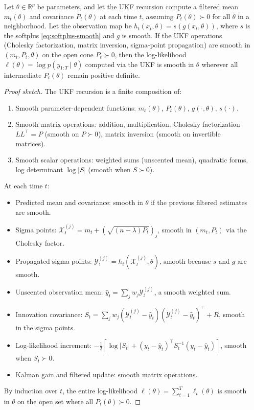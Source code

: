 \begin{proposition}
\label{prop:ukf-smooth}
Let $\theta \in \mathbb{R}^p$ be parameters, and let the UKF recursion compute a filtered mean $m_t(\theta)$ and covariance $P_t(\theta)$ at each time $t$, assuming $P_t(\theta) \succ 0$ for all $\theta$ in a neighborhood. Let the observation map be $h_t(x_t, \theta) = s(g(x_t, \theta))$, where $s$ is the softplus \eqref{eq:softplus-smooth} and $g$ is smooth. If the UKF operations (Cholesky factorization, matrix inversion, sigma-point propagation) are smooth in $(m_t, P_t, \theta)$ on the open cone $P_t \succ 0$, then the log-likelihood $\ell(\theta) = \log p(y_{1:T} \mid \theta)$ computed via the UKF is smooth in $\theta$ wherever all intermediate $P_t(\theta)$ remain positive definite.
\end{proposition}

\begin{proof}[Proof sketch]
The UKF recursion is a finite composition of:
\begin{enumerate}
\item Smooth parameter-dependent functions: $m_t(\theta)$, $P_t(\theta)$, $g(\cdot, \theta)$, $s(\cdot)$.
\item Smooth matrix operations: addition, multiplication, Cholesky factorization $L L^\top = P$ (smooth on $P \succ 0$), matrix inversion (smooth on invertible matrices).
\item Smooth scalar operations: weighted sums (unscented mean), quadratic forms, log determinant $\log |S|$ (smooth when $S \succ 0$).
\end{enumerate}

At each time $t$:
\begin{itemize}
\item Predicted mean and covariance: smooth in $\theta$ if the previous filtered estimates are smooth.
\item Sigma points: $\mathcal{X}_t^{(j)} = m_t + (\sqrt{(n + \lambda) P_t})_j$, smooth in $(m_t, P_t)$ via the Cholesky factor.
\item Propagated sigma points: $\mathcal{Y}_t^{(j)} = h_t(\mathcal{X}_t^{(j)}, \theta)$, smooth because $s$ and $g$ are smooth.
\item Unscented observation mean: $\hat{y}_t = \sum_j w_j \mathcal{Y}_t^{(j)}$, a smooth weighted sum.
\item Innovation covariance: $S_t = \sum_j w_j (\mathcal{Y}_t^{(j)} - \hat{y}_t)(\mathcal{Y}_t^{(j)} - \hat{y}_t)^\top + R$, smooth in the sigma points.
\item Log-likelihood increment: $-\frac{1}{2}[\log |S_t| + (y_t - \hat{y}_t)^\top S_t^{-1} (y_t - \hat{y}_t)]$, smooth when $S_t \succ 0$.
\item Kalman gain and filtered update: smooth matrix operations.
\end{itemize}

By induction over $t$, the entire log-likelihood $\ell(\theta) = \sum_{t=1}^T \ell_t(\theta)$ is smooth in $\theta$ on the open set where all $P_t(\theta) \succ 0$.
\end{proof}

